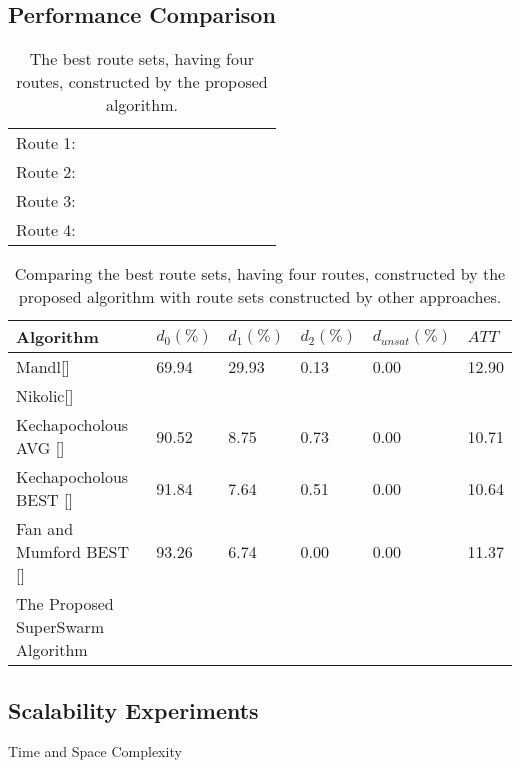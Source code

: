 \subsection{Performance Comparison}

\begin{table}[H]
	\centering
    \begin{tabular}{|l|l l l l l l l l|}
    \hline
    Route 1: & ~ & ~ & ~ & ~ & ~ & ~ & ~ & ~ \\
    Route 2: & ~ & ~ & ~ & ~ & ~ & ~ & ~ & ~ \\
    Route 3: & ~ & ~ & ~ & ~ & ~ & ~ & ~ & ~ \\
    Route 4: & ~ & ~ & ~ & ~ & ~ & ~ & ~ & ~ \\
	\hline
    \end{tabular}
    \caption {The best route sets, having four routes, constructed by the proposed algorithm.}
    \label{table:performanceComparison_bestRouteSet4}
	\end{table}

\begin{table}[H]
	\centering
    \begin{tabular}{|l||l|l|l|l|l|}
 	\hline
 	Algorithm & $d_0(\%)$ & $d_1(\%)$ & $d_2(\%)$ & $d_{unsat}(\%)$ & $ATT$ \\
 	\hline
    Mandl[] & 69.94 & 29.93 & 0.13 & 0.00 & 12.90 \\
    Nikolic[] & ~ & ~ & ~ & ~ & ~ \\
    Kechapocholous AVG [] & 90.52 & 8.75 & 0.73 & 0.00 & 10.71 \\
    Kechapocholous BEST [] & 91.84 & 7.64 & 0.51 & 0.00 & 10.64 \\
    Fan and Mumford BEST [] & 93.26 & 6.74 & 0.00 & 0.00 & 11.37 \\
	\hline
    \hline
    The Proposed SuperSwarm Algorithm & ~ & ~ & ~ & ~ & ~ \\
    \hline
    \end{tabular}
    \caption {Comparing the best route sets, having four routes, constructed by the proposed algorithm with route sets constructed by other approaches.}
    \label{table:performanceComparison_4}
	\end{table}

\subsection{Scalability Experiments}
Time and Space Complexity